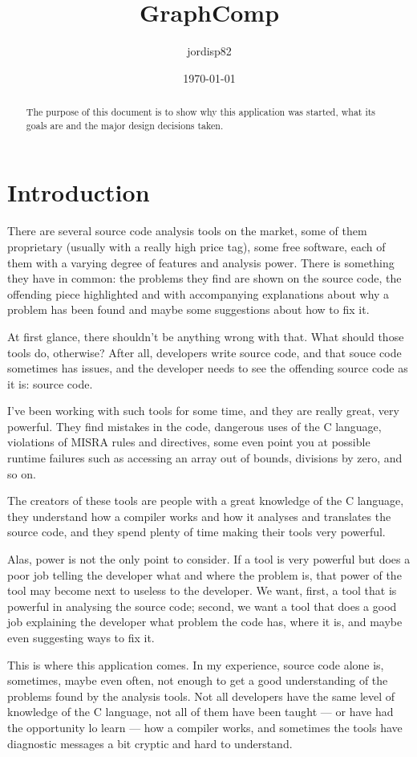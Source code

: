 \documentclass[a4paper,openany]{article}
\title{GraphComp}
\author{jordisp82}
\date{\today}
\begin{document}
\maketitle
\pagestyle{plain}
\begin{abstract}
The purpose of this document is to show why this application was started, what its goals are and the major design decisions taken.
\end{abstract}

\section{Introduction}
There are several source code analysis tools on the market, some of them proprietary (usually with a really high price tag), some free software, each of them with a varying degree of features and analysis power. There is something they have in common: the problems they find are shown on the source code, the offending piece highlighted and with accompanying explanations about why a problem has been found and maybe some suggestions about how to fix it.

At first glance, there shouldn't be anything wrong with that. What should those tools do, otherwise? After all, developers write source code, and that souce code sometimes has issues, and the developer needs to see the offending source code as it is: source code.

I've been working with such tools for some time, and they are really great, very powerful. They find mistakes in the code, dangerous uses of the C language, violations of MISRA rules and directives, some even point you at possible runtime failures such as accessing an array out of bounds, divisions by zero, and so on.

The creators of these tools are people with a great knowledge of the C language, they understand how a compiler works and how it analyses and translates the source code, and they spend plenty of time making their tools very powerful.

Alas, power is not the only point to consider. If a tool is very powerful but does a poor job telling the developer what and where the problem is, that power of the tool may become next to useless to the developer. We want, first, a tool that is powerful in analysing the source code; second, we want a tool that does a good job explaining the developer what problem the code has, where it is, and maybe even suggesting ways to fix it.

This is where this application comes. In my experience, source code alone is, sometimes, maybe even often, not enough to get a good understanding of the problems found by the analysis tools. Not all developers have the same level of knowledge of the C language, not all of them have been taught --- or have had the opportunity lo learn --- how a compiler works, and sometimes the tools have diagnostic messages a bit cryptic and hard to understand.
\end{document}
